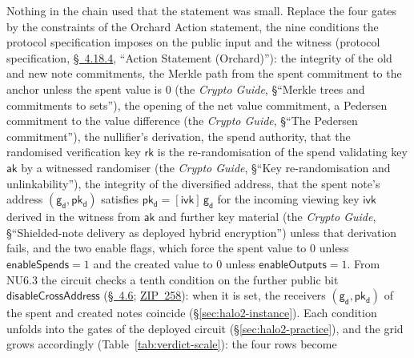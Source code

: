 \documentclass[11pt,a4paper]{article}
\theoremstyle{definition}
\newcommand{\rk}{\mathsf{rk}}
\newcommand{\aksym}{\ensuremath{\mathsf{ak}}}
\newcommand{\pkd}{\ensuremath{\mathsf{pk_d}}}
\newcommand{\gd}{\ensuremath{\mathsf{g_d}}}
\begin{document}
Nothing in the chain used that the statement was small. Replace the
four gates by the constraints of the Orchard Action statement, the nine
conditions the protocol specification imposes on the public input and
the witness (protocol specification,
\href{https://zips.z.cash/protocol/protocol.pdf\#actionstatement}{\S~4.18.4},
``Action Statement (Orchard)''): the integrity of the old and new note
commitments, the Merkle path from the spent commitment to the anchor
unless the spent value is $0$ (the \emph{Crypto Guide}, \S``Merkle trees
and commitments to sets''),
the opening of the net value commitment, a Pedersen commitment to the
value difference (the \emph{Crypto Guide}, \S``The Pedersen
commitment''), the nullifier's derivation, the spend authority, that
the randomised verification key $\rk$ is the re-randomisation of the
spend validating key $\aksym$ by a witnessed randomiser (the
\emph{Crypto Guide}, \S``Key re-randomisation and unlinkability''), the
integrity of the diversified address, that the spent note's address
$(\gd, \pkd)$ satisfies $\pkd = [\mathsf{ivk}]\,\gd$ for the incoming
viewing key $\mathsf{ivk}$ derived in the witness from $\aksym$ and
further key material (the \emph{Crypto Guide}, \S``Shielded-note
delivery as deployed hybrid encryption'') unless that derivation fails,
and the two enable flags,
which force the spent value to $0$ unless $\mathsf{enableSpends} = 1$
and the created value to $0$ unless $\mathsf{enableOutputs} = 1$. From
NU6.3 the circuit checks a tenth condition on the further public bit
$\mathsf{disableCrossAddress}$
(\href{https://zips.z.cash/protocol/nu6_3.pdf\#actiondesc}{\S~4.6};
\href{https://zips.z.cash/zip-0258}{ZIP~258}): when it is set, the
receivers $(\gd, \pkd)$ of the spent and created notes coincide
(\S\ref{sec:halo2-instance}). Each condition unfolds into the gates of the
deployed circuit
(\S\ref{sec:halo2-practice}), and the grid grows
accordingly (Table~\ref{tab:verdict-scale}): the four rows become
\end{document}
